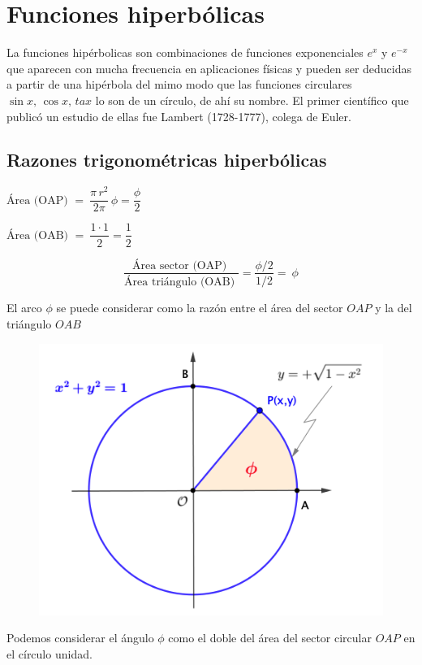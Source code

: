 \chapter{Funciones hiperbólicas}

\vspace{5mm}
La funciones hipérbolicas son combinaciones de funciones exponenciales $e^x$ y $e^{-x}$ que aparecen con mucha frecuencia en aplicaciones físicas y pueden ser deducidas a partir de una hipérbola del mimo modo que las funciones circulares $\sin x,\, \cos x,\, ta x$ lo son de un círculo, de ahí su nombre. El primer científico que publicó un estudio de ellas fue Lambert (1728-1777), colega de Euler.

\vspace{1cm}
\section{Razones trigonométricas hiperbólicas}
\label{fhip}
\vspace{0.5cm}


\begin{multicols}{2}
$\text{Área (OAP) } = \ \dfrac{\pi\, r^2}{2\pi}\,\phi= \dfrac \phi 2$

$\text{Área (OAB) } = \ \dfrac{1\cdot 1}{2}=\dfrac 1 2$

$$\dfrac{\text{Área sector (OAP) }}{\text{Área triángulo (OAB) }}=\dfrac{\phi/2}{1/2}=\ \phi$$

El arco $\phi$ se puede considerar como la razón  entre el área del sector $OAP$ y la del triángulo $OAB$
	\begin{figure}[H]
	\centering
	\includegraphics[width=.45\textwidth]{img-hiperbol/hiperbol01.png}
	\end{figure}
\end{multicols}
\begin{destacado}
	Podemos considerar el ángulo $\phi$ como el doble del área del sector circular $OAP$ en el círculo unidad.
\end{destacado}

